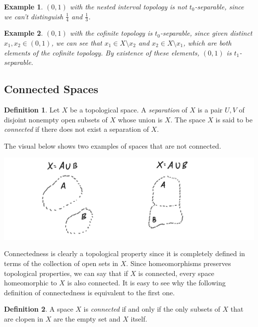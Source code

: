 \documentclass{article}
\newtheorem{example}{Example}[section]
\theoremstyle{remark}
\theoremstyle{definition}
\newtheorem{definition}{Definition}[section]
\begin{document}
\begin{example}
$(0,1)$ with the nested interval topology is not $t_0$-separable, since we can't distinguish $\frac{1}{4}$ and $\frac{1}{3}$.
\end{example}

\begin{example}
$(0,1)$ with the cofinite topology is $t_0$-separable, since given distinct $x_1, x_2 \in (0,1)$, we can see that $x_1 \in X \setminus {x_2}$ and $x_2 \in X \setminus {x_1}$, which are both elements of the cofinite topology. By existence of these elements, $(0,1)$ is $t_1$-separable. 
\end{example}

\subsection{Connected Spaces}
\begin{definition}
Let $X$ be a topological space. A \textit{separation} of $X$ is a pair $U, V$ of disjoint nonempty open subsets of $X$ whose union is $X$. The space $X$ is said to be \textit{connected} if there does not exist a separation of $X$. 

The visual below shows two examples of spaces that are not connected. 
\begin{center}
    \includegraphics[scale=0.25]{img/Not_Connected_Spaces_Examples.PNG}
\end{center}
\end{definition}

Connectedness is clearly a topological property since it is completely defined in terms of the collection of open sets in $X$. Since homeomorphisms preserves topological properties, we can say that if $X$ is connected, every space homeomorphic to $X$ is also connected. It is easy to see why the following definition of connectedness is equivalent to the first one. 

\begin{definition}
A space $X$ is \textit{connected} if and only if the only subsets of $X$ that are clopen in $X$ are the empty set and $X$ itself. 
\end{definition}
\end{document}
